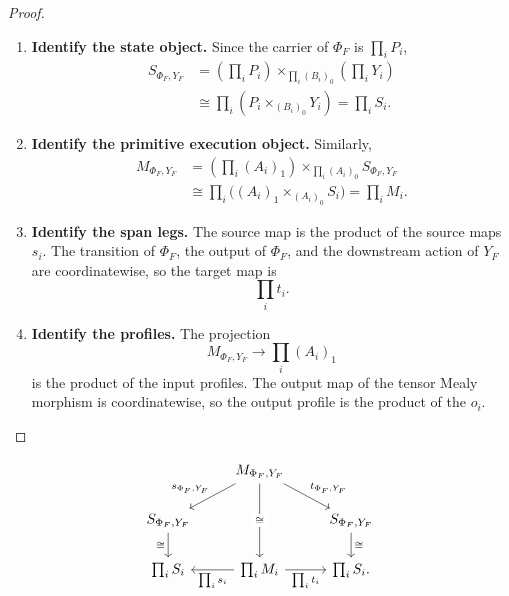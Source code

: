 \begin{proof}
    \leavevmode
    \begin{enumerate}
        \item \textbf{Identify the state object.}
        Since the carrier of \(\Phi_F\) is \(\prod_iP_i\),
        \[
        \begin{aligned}
            S_{\Phi_F,Y_F}
            &=
            \left(\prod_iP_i\right)
            \times_{\prod_i(B_i)_0}
            \left(\prod_iY_i\right)
            \\
            &\cong
            \prod_i(P_i\times_{(B_i)_0}Y_i)
            =
            \prod_iS_i.
        \end{aligned}
        \]

        \item \textbf{Identify the primitive execution object.}
        Similarly,
        \[
        \begin{aligned}
            M_{\Phi_F,Y_F}
            &=
            \left(\prod_i(A_i)_1\right)
            \times_{\prod_i(A_i)_0}
            S_{\Phi_F,Y_F}
            \\
            &\cong
            \prod_i\bigl((A_i)_1\times_{(A_i)_0}S_i\bigr)
            =
            \prod_iM_i.
        \end{aligned}
        \]

        \item \textbf{Identify the span legs.}
        The source map is the product of the source maps \(s_i\). The
        transition of \(\Phi_F\), the output of \(\Phi_F\), and the downstream
        action of \(Y_F\) are coordinatewise, so the target map is
        \[
            \prod_i t_i.
        \]

        \item \textbf{Identify the profiles.}
        The projection
        \[
            M_{\Phi_F,Y_F}\to\prod_i(A_i)_1
        \]
        is the product of the input profiles. The output map of the tensor
        Mealy morphism is coordinatewise, so the output profile is the product
        of the \(o_i\).
    \end{enumerate}
\end{proof}

\[
\begin{tikzcd}
&
M_{\Phi_F,Y_F}
    \arrow[dl,"s_{\Phi_F,Y_F}"']
    \arrow[dr,"t_{\Phi_F,Y_F}"]
    \arrow[dd,"\cong" description]
&
\\
S_{\Phi_F,Y_F}
    \arrow[d,"\cong"']
&&
S_{\Phi_F,Y_F}
    \arrow[d,"\cong"]
\\
\prod_i S_i
&
\prod_i M_i
    \arrow[l,"\prod_i s_i"]
    \arrow[r,"\prod_i t_i"']
&
\prod_i S_i .
\end{tikzcd}
\]

